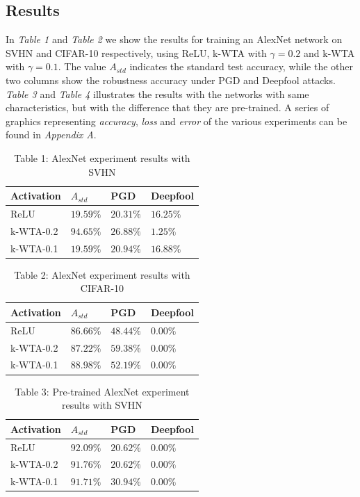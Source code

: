 \documentclass[a4paper]{article}
\begin{document}
	\subsection{Results}
	In \textit{Table 1} and \textit{Table 2} we show the results for training an AlexNet network on SVHN and CIFAR-10 respectively, using ReLU, k-WTA with $\gamma = 0.2$ and k-WTA with $\gamma = 0.1$. The value $A_{std}$ indicates the standard test accuracy, while the other two columns show the robustness accuracy under PGD and Deepfool attacks. \textit{Table 3} and \textit{Table 4} illustrates the results with the networks with same characteristics, but with the difference that they are pre-trained.
	A series of graphics representing \emph{accuracy}, \emph{loss} and \emph{error} of the various experiments can be found in \emph{Appendix A}.
	\begin{table}[!htbp]
		\begin{tabular}{|p{}|p{}|p{}|p{}|}
			\hline
			Activation	& $A_{std}$	&	PGD	&	Deepfool	\\
			\hline
			ReLU		&$19.59\%$&$20.31\%$&$16.25\%$	\\
			\hline
			k-WTA-0.2	&$94.65\%$&$26.88\%$&$1.25\%$	\\
			\hline
			k-WTA-0.1	&$19.59\%$&$20.94\%$&$16.88\%$	\\
			\hline
		\end{tabular}
		\caption{Table 1: AlexNet experiment results with SVHN}\label{alexnetSVHN}
	\end{table}
	\begin{table}[!htbp]
		\begin{tabular}{|p{}|p{}|p{}|p{}|}
			\hline
			Activation	& $A_{std}$	&	PGD	&	Deepfool	\\
			\hline
			ReLU		&$86.66\%$&$48.44\%$&$0.00\%$	\\
			\hline
			k-WTA-0.2	&$87.22\%$&$59.38\%$&$0.00\%$	\\
			\hline
			k-WTA-0.1	&$88.98\%$&$52.19\%$&$0.00\%$	\\
			\hline
		\end{tabular}
		\caption{Table 2: AlexNet experiment results with CIFAR-10}\label{alexnetCIFAR10}
	\end{table}
	\begin{table}[!htbp]
		\begin{tabular}{|p{}|p{}|p{}|p{}|}
			\hline
			Activation	& $A_{std}$	&	PGD	&	Deepfool	\\
			\hline
			ReLU		&$92.09\%$&$20.62\%$&$0.00\%$	\\
			\hline
			k-WTA-0.2	&$91.76\%$&$20.62\%$&$0.00\%$	\\
			\hline
			k-WTA-0.1	&$91.71\%$&$30.94\%$&$0.00\%$	\\
			\hline
		\end{tabular}
		\caption{Table 3: Pre-trained AlexNet experiment results with SVHN}\label{pre-alexnetSVHN}
	\end{table}
\end{document}
